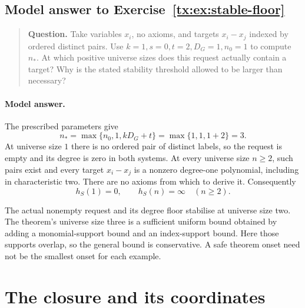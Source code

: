 \begin{samepage}

\subsection*{Model answer to Exercise~\ref{tx:ex:stable-floor}}\label{tx:ans:stable-floor}

\begin{quote}\small\textbf{Question.} Take variables $x_i$, no axioms, and targets $x_i-x_j$ indexed by
ordered distinct pairs. Use $k=1,s=0,t=2,D_G=1,n_0=1$ to compute $n_*$.
At which positive universe sizes does this request actually contain a target?
Why is the stated stability threshold allowed to be larger than necessary?
\end{quote}

\paragraph{Model answer.}
The prescribed parameters give
\[
          n_*=\max\{n_0,1,kD_G+t\}
              =\max\{1,1,1+2\}=3.
\]
At universe size \(1\) there is no ordered pair of distinct labels, so the
request is empty and its degree is zero in both systems.
At every universe size \(n\ge2\), such pairs exist and every target
\(x_i-x_j\) is a nonzero degree-one polynomial, including in
characteristic two. There are no axioms from which to derive it.
Consequently
\[
       h_S(1)=0,\qquad h_S(n)=\infty\quad(n\ge2).
\]
\end{samepage}

The actual nonempty request and its degree floor stabilise at universe size
two. The theorem's universe size three is a sufficient uniform bound obtained
by adding a monomial-support bound and an index-support bound.
Here those supports overlap, so the general bound is conservative.
A safe theorem onset need not be the smallest onset for each example.


\par


\section{The closure and its coordinates}

